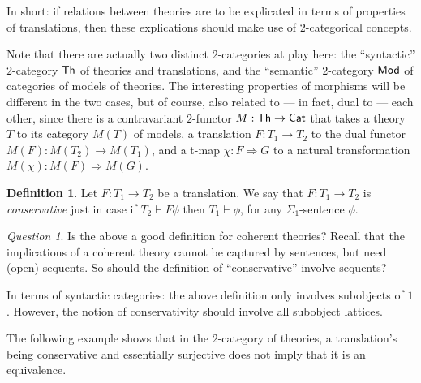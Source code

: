 \documentclass[12pt]{article}
\theoremstyle{definition}
\newtheorem*{defn}{Definition}
\theoremstyle{remark}
\newtheorem*{question}{Question}
\newcommand{\3}{\mathcal}
\begin{document}
In short: if relations between theories are to be explicated in terms
of properties of translations, then these explications should make use
of $2$-categorical concepts.

Note that there are actually two distinct $2$-categories at play here:
the ``syntactic'' $2$-category $\mathsf{Th}$ of theories and translations,
and the ``semantic'' $2$-category $\mathsf{Mod}$ of categories of models of
theories. The interesting properties of morphisms will be different in
the two cases, but of course, also related to --- in fact, dual to ---
each other, since there is a contravariant $2$-functor
$M:\mathsf{Th}\to\mathsf{Cat}$ that takes a theory $T$ to its category $M(T)$ of
models, a translation $F:T_1\to T_2$ to the dual functor
$M(F):M(T_2)\to M(T_1)$, and a t-map $\chi : F\Rightarrow G$ to a
natural transformation $M(\chi ):M(F)\Rightarrow M(G)$.

\begin{defn} Let $F:T_1\to T_2$ be a translation. We say that
  $F:T_1\to T_2$ is \emph{conservative} just in case if
  $T_2\vdash F\phi$ then $T_1\vdash \phi$, for any
  $\Sigma _1$-sentence $\phi$. \end{defn}

\begin{question} Is the above a good definition for coherent theories?
  Recall that the implications of a coherent theory cannot be captured
  by sentences, but need (open) sequents. So should the definition of
  ``conservative'' involve sequents?

  In terms of syntactic categories: the above definition only involves
  subobjects of $1$. However, the notion of conservativity should
  involve all subobject lattices. \end{question}

The following example shows that in the $2$-category of theories, a
translation's being conservative and essentially surjective does not
imply that it is an equivalence.
\end{document}

